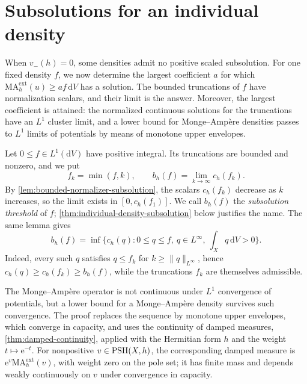 \section{Subsolutions for an individual density}
\label{sec:individual-density-subsolutions}

When $v_-(h)=0$, some densities admit no positive scaled subsolution. For one fixed density $f$, we now determine the largest coefficient $a$ for which $\mathrm{MA}^{\mathrm{ext}}_h(u)\geq af\,\mathrm{d}V$ has a solution. The bounded truncations of $f$ have normalization scalars, and their limit is the answer. Moreover, the largest coefficient is attained: the normalized continuous solutions for the truncations have an $L^1$ cluster limit, and a lower bound for Monge--Amp\`ere densities passes to $L^1$ limits of potentials by means of monotone upper envelopes.

Let $0\leq f\in L^1(\mathrm{d}V)$ have positive integral. Its truncations are bounded and nonzero, and we put
\begin{equation}\label{eq:individual-truncated-normalizer}
 f_k=\min(f,k),\qquad
 b_h(f)=\lim_{k\to\infty}c_h(f_k).
\end{equation}
By \cref{lem:bounded-normalizer-subsolution}, the scalars $c_h(f_k)$ decrease as $k$ increases, so the limit exists in $[0,c_h(f_1)]$. We call $b_h(f)$ the \emph{subsolution threshold} of $f$; \cref{thm:individual-density-subsolution} below justifies the name. The same lemma gives
\begin{equation}\label{eq:individual-bounded-tests}
 b_h(f)=\inf\{c_h(q):0\leq q\leq f,\ q\in L^\infty,
                                      \ \textstyle\int_Xq\,\mathrm{d}V>0\}.
\end{equation}
Indeed, every such $q$ satisfies $q\leq f_k$ for $k\geq\|q\|_{L^\infty}$, hence $c_h(q)\geq c_h(f_k)\geq b_h(f)$, while the truncations $f_k$ are themselves admissible.

The Monge--Amp\`ere operator is not continuous under $L^1$ convergence of potentials, but a lower bound for a Monge--Amp\`ere density survives such convergence. The proof replaces the sequence by monotone upper envelopes, which converge in capacity, and uses the continuity of damped measures, \cref{thm:damped-continuity}, applied with the Hermitian form $h$ and the weight $t\mapsto\mathrm{e}^{-t}$. For nonpositive $v\in\mathrm{PSH}(X,h)$, the corresponding damped measure is $\mathrm{e}^{v}\mathrm{MA}^{\mathrm{ext}}_h(v)$, with weight zero on the pole set; it has finite mass and depends weakly continuously on $v$ under convergence in capacity.

